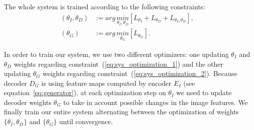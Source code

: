 The whole system is trained according to the following constraints:
\begin{align}
	\left( \theta_{I}, \theta_{D} \right) & := arg\,\underset{\theta_{I}, \theta_{D}}{min} \left[ L_{\theta_{I}} + L_{\theta_{D}} + L_{\theta_{I},\theta_{D}} \right], \label{eq:sys_optimization_1} \\ 	
	\left( \theta_{G} \right) & := arg\,\underset{\theta_{G}}{min} \left[ L_{\theta_{G}} \right]. 	\label{eq:sys_optimization_2}
\end{align}

In order to train our system, we use two different optimizers: one updating $\theta_{I}$ and $\theta_{D}$ weights regarding constraint~(\ref{eq:sys_optimization_1}) and the other updating $\theta_{G}$ weights regarding constraint~(\ref{eq:sys_optimization_2}). Because decoder $D_G$ is using feature maps computed by encoder $E_I$ (see equation~\ref{eq:generator}), at each optimization step on $\theta_{I}$ we need to update decoder weights $\theta_{G}$ to take in account possible changes in the image features. We finally train our entire system alternating between the optimization of weights $\{\theta_{I}, \theta_{D}\}$ and $\{\theta_G\}$ until convergence.

%

%

